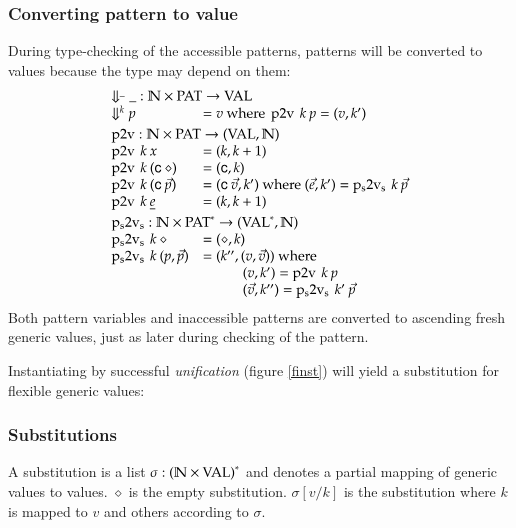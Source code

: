\subsubsection{Converting pattern to value}
During type-checking of the accessible patterns, patterns will be converted to values because the type may depend on them:
\[
\begin{array}{ll}
\multicolumn{2}{l}{\ptv{\_}{\_}: \cN \times \Pat \ra \Val}\\
\ptv{k}{p} & = v \mbox{ where } \ptvx \: k \: p = (v,k')
\vs\\ 
\multicolumn{2}{l}{\ptvx : \cN \times \Pat \ra (\Val,\cN)}\\
\ptvx \: k \:x & = (k,k+1) \\
\ptvx \: k \: (\cc \: \diamond) & = (\cc,k) \\
\ptvx \: k \: (\cc \: \vec{p}) & = (\cc \: \vec{v},k') \mbox{ where } (\vec{e},k') = \pstvs \: k \: \vec{p}\\
\ptvx \: k \: \inacc{e} & = (k,k+1) 
\vs\\
\multicolumn{2}{l}{\pstvs : \cN \times \ves{\Pat} \ra (\ves{\Val},\cN)}\\
\pstvs \: k \: \diamond & = (\diamond,k) \\
\pstvs \: k \: (p,\vec{p}) & = (k'', (v,\vec{v})) \mbox{ where } \\
& \spcx (v,k') = \ptvx \: k \: p \\
& \spcx (\vec{v},k'') = \pstvs \: k' \: \vec{p}  
\end{array}
\]
Both pattern variables and inaccessible patterns are converted to ascending fresh generic values, just as later during checking of the pattern.

Instantiating by successful \emph{unification} (figure \ref{finst}) will yield a substitution for flexible generic values:
\subsubsection{Substitutions}
A substitution is a list $\sigma : {(\mathbb{N} \times \operatorname{VAL})}^{\ast} $ and denotes a partial mapping of generic values to values.
$\diamond$ is the empty substitution.
$\sigma[v/k] $ is the substitution where $k$ is mapped to $v$ and others according to $\sigma$.

